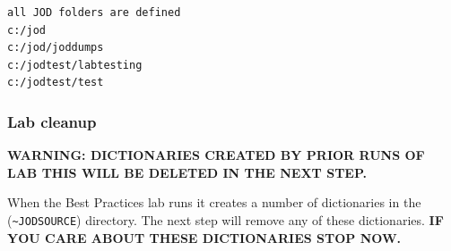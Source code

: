 \documentclass[11pt,letter,landscape]{article}
\begin{document}
    \begin{Verbatim}[commandchars=\\\{\}]
all JOD folders are defined
c:/jod                     
c:/jod/joddumps            
c:/jodtest/labtesting      
c:/jodtest/test            

    \end{Verbatim}

    \subsubsection{Lab cleanup}\label{lab-cleanup}

\textbf{WARNING: DICTIONARIES CREATED BY PRIOR RUNS OF LAB THIS WILL BE
DELETED IN THE NEXT STEP.}

When the Best Practices lab runs it creates a number of dictionaries in
the (\texttt{\textasciitilde{}JODSOURCE}) directory. The next step will
remove any of these dictionaries. \textbf{IF YOU CARE ABOUT THESE
DICTIONARIES STOP NOW.}
\end{document}

